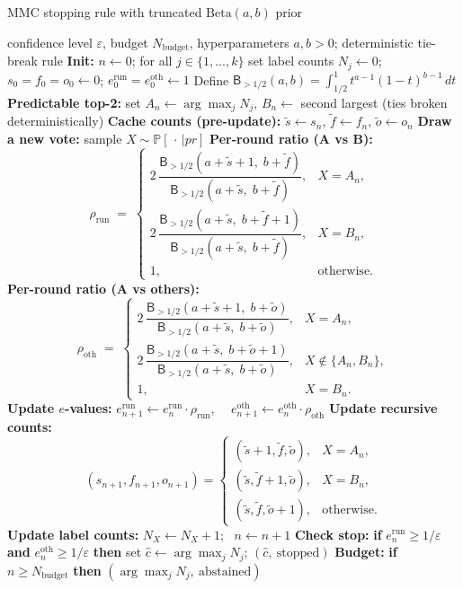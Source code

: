 \begin{algorithm}[t]
\small{
\caption{MMC stopping rule with truncated $\mathrm{Beta}(a,b)$ prior}
\label{alg:mmc_truncbeta}
\begin{algorithmic}[1]
\Require confidence level $\varepsilon$, budget $N_{\text{budget}}$, hyperparameters $a,b>0$; deterministic tie-break rule
\State \textbf{Init:} $n\gets 0$; for all $j\in\{1,\dots,k\}$ set label counts $N_j\gets 0$; 
$s_0=f_0=o_0\gets 0$; $e^{\mathrm{run}}_0=e^{\mathrm{oth}}_0\gets 1$
\State Define $\mathsf{B}_{>1/2}(a,b)=\int_{1/2}^1 t^{a-1}(1-t)^{b-1}\,dt$
  \State \textbf{Predictable top-2:} set $A_n\gets\arg\max_j N_j$, $B_n\gets$ second largest (ties broken deterministically)
  \State \textbf{Cache counts (pre-update):} $\tilde s\gets s_n$, $\tilde f\gets f_n$, $\tilde o\gets o_n$
  \State \textbf{Draw a new vote:} sample $X\sim\mathbb P[\,\cdot\,| pr]$ 
  \State \textbf{Per-round ratio (A vs B):}
  \[
  \rho_{\mathrm{run}} \;=\;
  \begin{cases}
    2\,\dfrac{\mathsf{B}_{>1/2}(a+\tilde s+1,\; b+\tilde f)}{\mathsf{B}_{>1/2}(a+\tilde s,\; b+\tilde f)}, & X=A_n,\\[2mm]
    2\,\dfrac{\mathsf{B}_{>1/2}(a+\tilde s,\; b+\tilde f+1)}{\mathsf{B}_{>1/2}(a+\tilde s,\; b+\tilde f)}, & X=B_n,\\[2mm]
    1,& \text{otherwise.}
  \end{cases}
  \]
  \State \textbf{Per-round ratio (A vs others):}
  \[
  \rho_{\mathrm{oth}} \;=\;
  \begin{cases}
    2\,\dfrac{\mathsf{B}_{>1/2}(a+\tilde s+1,\; b+\tilde o)}{\mathsf{B}_{>1/2}(a+\tilde s,\; b+\tilde o)}, & X=A_n,\\[2mm]
    2\,\dfrac{\mathsf{B}_{>1/2}(a+\tilde s,\; b+\tilde o+1)}{\mathsf{B}_{>1/2}(a+\tilde s,\; b+\tilde o)}, & X\notin\{A_n,B_n\},\\[2mm]
    1,& X=B_n.
  \end{cases}
  \]
  \State \textbf{Update $e$-values:} $e^{\mathrm{run}}_{n+1}\gets e^{\mathrm{run}}_{n}\cdot \rho_{\mathrm{run}}$, \ \ $e^{\mathrm{oth}}_{n+1}\gets e^{\mathrm{oth}}_{n}\cdot \rho_{\mathrm{oth}}$
  \State \textbf{Update recursive counts:}
  \[
  (s_{n+1},f_{n+1},o_{n+1})=
  \begin{cases}
    (\tilde s+1,\tilde f,\tilde o), & X=A_n,\\
    (\tilde s,\tilde f+1,\tilde o), & X=B_n,\\
    (\tilde s,\tilde f,\tilde o+1), & \text{otherwise.}
  \end{cases}
  \]
  \State \textbf{Update label counts:} $N_X\gets N_X+1$; \ $n\gets n+1$
  \State \textbf{Check stop:} \textbf{if} $e^{\mathrm{run}}_{n}\ge 1/\varepsilon$ \textbf{and} $e^{\mathrm{oth}}_{n}\ge 1/\varepsilon$ \textbf{then}
     \State \hspace{1.5em} set $\hat c\gets \arg\max_j N_j$; \Return $(\hat c,\ \text{stopped})$
  \State \textbf{Budget:} \textbf{if} $n\ge N_{\text{budget}}$ \textbf{then} \Return $(\arg\max_j N_j,\ \text{abstained})$
\EndWhile
\end{algorithmic}}
\normalsize
\end{algorithm}

